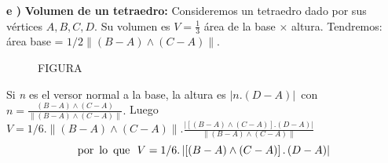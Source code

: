 \textbf{e ) }\textbf{Volumen de un tetraedro: }Consideremos un
tetraedro dado por sus v\'{e}rtices $A, B, C, D$. Su volumen es $V
= \frac{{1}}{{3}}$ \'{a}rea de la base $ \times $ altura.
Tendremos: \'{a}rea base = $1/2\left\| {\left( {B - A} \right)
\wedge \left( {C - A} \right)} \right\|$.

\begin{figure}[htb]
\centering
FIGURA
\end{figure}

%

 Si \textit{n} es el versor normal a la base, la altura es $
 \left| {n.\left( {D - A} \right)} \right|$\, con \,$n = \frac{{\left(
{B - A} \right) \wedge \left( {C - A} \right)}}{{\left\| {\left(
{B - A} \right) \wedge \left( {C - A} \right)} \right\|}}.$ Luego
$V = 1/6.\left\| {\left( {B - A} \right) \wedge \left( {C - A}
\right)} \right\|.\frac{{\left| {\left[ {\left( {B - A} \right)
\wedge \left( {C - A} \right)} \right].\left( {D - A} \right)}
\right|}}{{\left\| {\left( {B - A} \right) \wedge \left( {C - A}
\right)} \right\|}}$
\[ {\rm por\,\,\, lo\,\,\, que\,\,\,\,}
V = 1/6.\left| {\left[ {\left( {B - A} \right) \wedge \left( {C -
A} \right)} \right].\left( {D - A} \right)} \right|
\]

\bigskip

